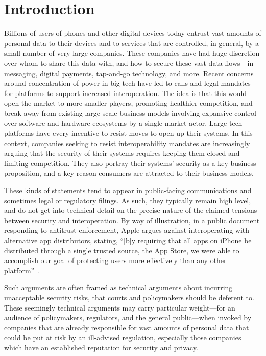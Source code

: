 \documentclass[letterpaper,twocolumn,10pt]{article}
\begin{document}
\section{Introduction}

Billions of users of phones and other digital devices today entrust vast amounts of personal data to their devices and to services that are controlled, in general, by a small number of very large companies. These companies have had huge discretion over whom to share this data with, and how to secure these vast data flows---in messaging, digital payments, tap-and-go technology, and more. Recent concerns around concentration of power in big tech have led to calls and legal mandates for platforms to support increased interoperation. The idea is that this would open the market to more smaller players, promoting healthier competition, and break away from existing large-scale business models involving expansive control over software and hardware ecosystems by a single market actor. Large tech platforms have every incentive to resist moves to open up their systems. In this context, companies seeking to resist interoperability mandates are increasingly arguing that the security of their systems requires keeping them closed and limiting competition. They also portray their systems' security as a key business proposition, and a key reason consumers are attracted to their business models. 

These kinds of statements tend to appear in public-facing communications and sometimes legal or regulatory filings. As such, they typically remain high level, and do not get into technical detail on the precise nature of the claimed tensions between security and interoperation. By way of illustration, in a public document responding to antitrust enforcement, Apple argues against interoperating with alternative app distributors, stating, ``[b]y requiring that all apps on iPhone be distributed through a single trusted
source, the App Store, we were able to accomplish our goal of protecting users more effectively than any other platform''~\cite{apple_white_paper}.

Such arguments are often framed as technical arguments about incurring unacceptable security risks, that courts and policymakers should be deferent to. These seemingly technical arguments may carry particular weight---for an audience of policymakers, regulators, and the general public---when invoked by companies that are already responsible for vast amounts of personal data that could be put at risk by an ill-advised regulation, especially those companies which have an established reputation for security and privacy. 
\end{document}
